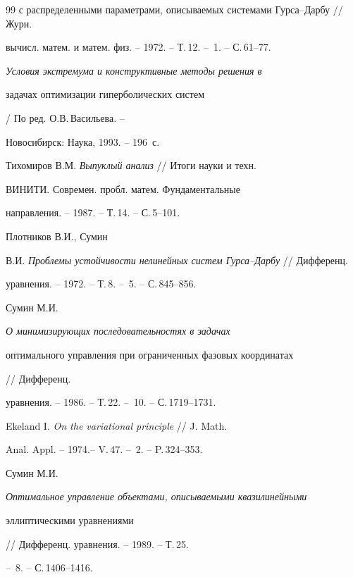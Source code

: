 \begin{thebibliography}{99}
{с распределенными параметрами, описываемых системами Гурса--Дарбу} // Журн.


вычисл. матем. и матем. физ. -- 1972. -- Т.\,12. -- \No\,1. -- С.\,61--77.




{\it Условия экстремума и конструктивные методы решения в


задачах оптимизации гиперболических систем} / По ред. О.В.\,Васильева. --


Новосибирск: Наука, 1993. -- 196~с.




Тихомиров В.М. {\it Выпуклый анализ} // Итоги науки и техн.


ВИНИТИ. Современ. пробл. матем. Фундаментальные


направления. -- 1987. -- Т.\,14. -- С.\,5--101.




Плотников В.И., Сумин


В.И. {\it Проблемы устойчивости нелинейных систем Гурса--Дарбу} // Дифференц.


уравнения. -- 1972. -- Т.\,8. -- \No\,5. -- С.\,845--856.




Сумин М.И. {\it О минимизирующих последовательностях в задачах


оптимального управления при ограниченных фазовых координатах} // Дифференц.


уравнения. -- 1986. -- Т.\,22. -- \No\,10. -- С.\,1719--1731.




Ekeland I. {\it On the variational principle} // J. Math.


Anal. Appl. -- 1974.-- V.\,47. -- \No\,2. -- P.\,324--353.




Сумин М.И. {\it Оптимальное управление объектами, описываемыми квазилинейными


эллиптическими уравнениями} // Дифференц. уравнения. -- 1989. -- Т.\,25.


-- \No\,8. -- С.\,1406--1416.





\end{thebibliography}





\vskip 2cm












\label{end}











